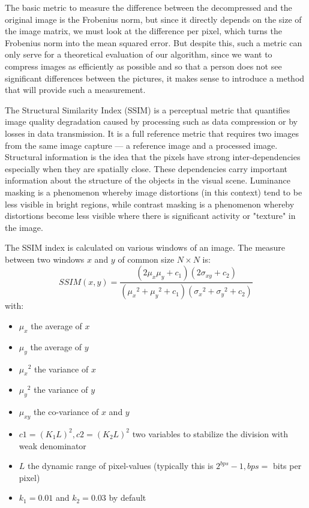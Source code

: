 The basic metric to measure the difference between the decompressed and the original image is the Frobenius norm, but since it directly depends on the size of the image matrix, we must look at the difference per pixel, which turns the Frobenius norm into the mean squared error. But despite this, such a metric can only serve for a theoretical evaluation of our algorithm, since we want to compress images as efficiently as possible and so that a person does not see significant differences between the pictures, it makes sense to introduce a method that will provide such a measurement.

The Structural Similarity Index (SSIM) is a perceptual metric that quantifies image quality degradation caused by processing such as data compression or by losses in data transmission. It is a full reference metric that requires two images from the same image capture — a reference image and a processed image. Structural information is the idea that the pixels have strong inter-dependencies especially when they are spatially close. These dependencies carry important information about the structure of the objects in the visual scene. Luminance masking is a phenomenon whereby image distortions (in this context) tend to be less visible in bright regions, while contrast masking is a phenomenon whereby distortions become less visible where there is significant activity or "texture" in the image.

The SSIM index is calculated on various windows of an image. The measure between two windows $x$ and $y$ of common size $N \times N$ is: $$ SSIM(x, y)=\frac{(2\mu_x\mu_y + c_1)(2 \sigma_{xy} + c_2)}{({\mu_x}^2 + {\mu_y}^2 + c_1)({\sigma_x}^2 + {\sigma_y}^2 + c_2)} $$ with:

\begin{itemize}
  \item $\mu_x$ the average of $x$
  \item $\mu_y$ the average of $y$
  \item ${\mu_x}^2$ the variance of $x$
  \item ${\mu_y}^2$ the variance of $y$
  \item $\mu_{x y}$ the co-variance of $x$ and $y$
  \item $c1 = {(K_1 L)}^2 , c2 = {(K_2 L)}^2$ two variables to stabilize the division with weak denominator
  \item $L$ the dynamic range of pixel-values (typically this is $2^{bps} - 1, bps = $ bits per pixel)
  \item $k_1 = 0.01$ and $k_2 = 0.03$ by default
\end{itemize}


